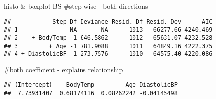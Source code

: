 \documentclass[
  ignorenonframetext,
]{beamer}
\begin{document}
\begin{frame}[fragile]{histo \& boxplot BS}
\#step-wise - both directions

\begin{verbatim}
##            Step Df Deviance Resid. Df Resid. Dev      AIC
## 1               NA       NA      1013   66277.66 4240.469
## 2    + BodyTemp -1 646.5862      1012   65631.07 4232.528
## 3         + Age -1 781.9088      1011   64849.16 4222.375
## 4 + DiastolicBP -1 273.7576      1010   64575.40 4220.086
\end{verbatim}

\#both coefficient - explains relationship

\begin{verbatim}
## (Intercept)    BodyTemp         Age DiastolicBP 
##  7.73931407  0.68174116  0.08262242 -0.04145498
\end{verbatim}
\end{frame}
\end{document}
